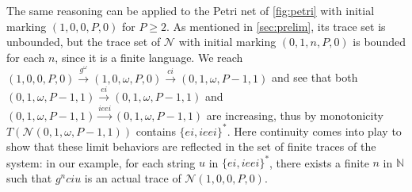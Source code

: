 \documentclass[11pt,reqno,a4paper]{amsart}
\newcommand{\ru}[1]{\xrightarrow{#1}}
\theoremstyle{plain}
\theoremstyle{definition}
\theoremstyle{remark}
\begin{document}
The same reasoning can be applied to the Petri net of
\autoref{fig:petri} with initial marking $(1,0,0,P,0)$ for $P\geq 2$.
As mentioned in \autoref{sec:prelim}, its trace set is unbounded, but
the trace set of $\mathcal{N}$ with initial marking
$(0,1,n,P,0)$ is bounded for each $n$, since it is a finite language.
We reach
$(1,0,0,P,0)\ru{g^\omega}(1,0,\omega,P,0)\ru{ci}(0,1,\omega,P-1,1)$
and see that both $(0,1,\omega,P-1,1)\ru{ei}(0,1,\omega,P-1,1)$ and
$(0,1,\omega,P-1,1)\ru{ieei}(0,1,\omega,P-1,1)$ are increasing,
thus by monotonicity $T(\mathcal{N}(0,1,\omega,P-1,1))$ contains
$\{ei,ieei\}^\ast$.  Here continuity comes into play to show that
these limit behaviors are reflected in the set of finite traces
of the system: in our example, for each string $u$ in $\{ei,ieei\}^\ast$,
there exists a finite $n$ in $\mathbb{N}$ such that $g^{n}ciu$ is an actual
trace of $\mathcal{N}(1,0,0,P,0)$.
\end{document}

